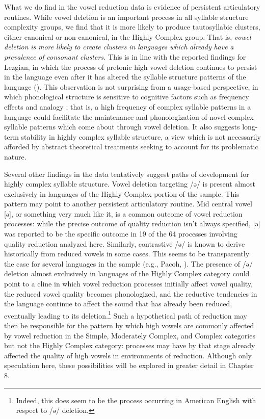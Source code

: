   What we do find in the vowel reduction data is evidence of persistent articulatory routines. While vowel deletion is an important process in all syllable structure complexity groups, we find that it is more likely to produce tautosyllabic clusters, either canonical or non-canonical, in the Highly Complex group. That is, \textit{vowel} \textit{deletion} \textit{is} \textit{more} \textit{likely} \textit{to} \textit{create} \textit{clusters} \textit{in} \textit{languages} \textit{which} \textit{already} \textit{have} \textit{a} \textit{prevalence} \textit{of} \textit{consonant} \textit{clusters.} This is in line with the reported findings for Lezgian, in which the process of pretonic high vowel deletion continues to persist in the language even after it has altered the syllable structure patterns of the language (\citealt{ChitoranBabaliyeva2007}). This observation is not surprising from a usage-based perspective, in which phonological structure is sensitive to cognitive factors such as frequency effects and analogy \citep{Bybee2001}; that is, a high frequency of complex syllable patterns in a language could facilitate the maintenance and phonologization of novel complex syllable patterns which come about through vowel deletion. It also suggests long-term stability in highly complex syllable structure, a view which is not necessarily afforded by abstract theoretical treatments seeking to account for its problematic nature.



  Several other findings in the data tentatively suggest paths of development for highly complex syllable structure. Vowel deletion targeting /ə/ is present almost exclusively in languages of the Highly Complex portion of the sample. This pattern may point to another persistent articulatory routine. Mid central vowel [ə], or something very much like it, is a common outcome of vowel reduction processes: while the precise outcome of quality reduction isn’t always specified, [ə] was reported to be the specific outcome in 19 of the 64 processes involving quality reduction analyzed here. Similarly, contrastive /ə/ is known to derive historically from reduced vowels in some cases. This seems to be transparently the case for several languages in the sample (e.g., Pacoh, \citealt{Alves2000}). The presence of /ə/ deletion almost exclusively in languages of the Highly Complex category could point to a cline in which  vowel reduction processes initially affect vowel quality,  the reduced vowel quality becomes phonologized, and  the reductive tendencies in the language continue to affect the sound that has already been reduced, eventually leading to its deletion.\footnote{ \textrm{Indeed, this does seem to be the process occurring in American English with respect to /ə/ deletion.}} Such a hypothetical path of reduction may then be responsible for the pattern by which high vowels are commonly affected by vowel reduction in the Simple, Moderately Complex, and Complex categories but not the Highly Complex category: processes may have by that stage already affected the quality of high vowels in environments of reduction. Although only speculation here, these possibilities will be explored in greater detail in Chapter 8.


